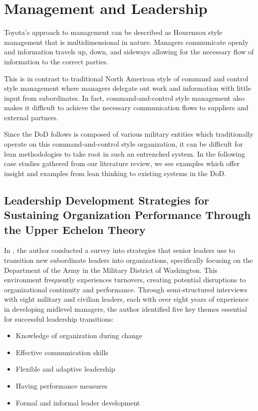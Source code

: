 \documentclass{article}
\begin{document}
	\section{Management and Leadership}

		Toyota's approach to management can be described as Hourensou style management that is multidimensional in nature.
		Managers communicate openly and information travels up, down, and sideways allowing for the necessary flow of information to the correct parties. 

		This is in contrast to traditional North American style of command and control style management where managers delegate out work and information with little input from subordinates.
		In fact, command-and-control style management also makes it difficult to achieve the necessary communication flows to suppliers and external partners.

		Since the DoD follows is composed of various military entities which traditionally operate on this command-and-control style organization, it can be difficult for lean methodologies to take root in such an entrenched system.
		In the following case studies gathered from our literature review, we see examples which offer insight and examples from lean thinking to existing systems in the DoD.


	\subsection{Leadership Development Strategies for Sustaining Organization Performance Through the Upper Echelon Theory \cite{McCants2024}}	

		In \cite{McCants2024}, the author conducted a survey into strategies that senior leaders use to transition new subordinate leaders into organizations, specifically focusing on the Department of the Army in the Military District of Washington. 
		This environment frequently experiences turnovers, creating potential disruptions to organizational continuity and performance.
		Through semi-structured interviews with eight military and civilian leaders, each with over eight years of experience in developing midlevel managers, the author identified five key themes essential for successful leadership transitions:

		\begin{itemize}
			\item Knowledge of organization during change
			\item Effective communication skills
			\item Flexible and adaptive leadership
			\item Having performance measures
			\item Formal and informal leader development
		\end{itemize}
\end{document}
